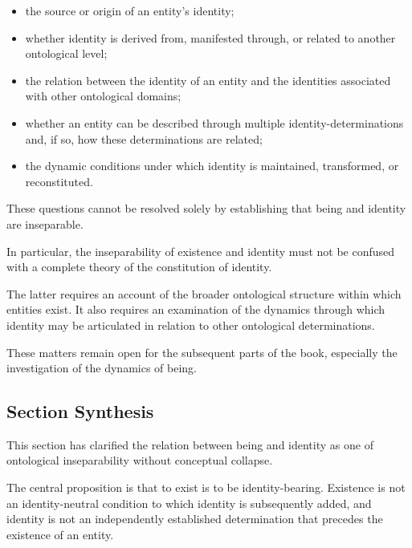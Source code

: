 \begin{itemize}
    \item the source or origin of an entity's
    identity;
    \item whether identity is derived from,
    manifested through, or related to another
    ontological level;
    \item the relation between the identity of
    an entity and the identities associated
    with other ontological domains;
    \item whether an entity can be described
    through multiple identity-determinations
    and, if so, how these determinations are
    related;
    \item the dynamic conditions under which
    identity is maintained, transformed, or
    reconstituted.
\end{itemize}

These questions cannot be resolved solely
by establishing that being and identity are
inseparable.

In particular, the inseparability of existence
and identity must not be confused with a
complete theory of the constitution of identity.

The latter requires an account of the broader
ontological structure within which entities
exist. It also requires an examination of
the dynamics through which identity may be
articulated in relation to other ontological
determinations.

These matters remain open for the subsequent
parts of the book, especially the investigation
of the dynamics of being.



\subsection{Section Synthesis}
\label{subsec:being-and-identity-section-synthesis}

This section has clarified the relation between
being and identity as one of ontological
inseparability without conceptual collapse.

The central proposition is that to exist is
to be identity-bearing. Existence is not an
identity-neutral condition to which identity
is subsequently added, and identity is not
an independently established determination
that precedes the existence of an entity.

